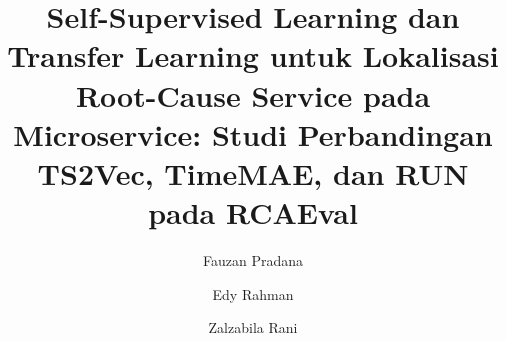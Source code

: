 \documentclass[runningheads]{llncs}
\begin{document}
\title{Self-Supervised Learning dan Transfer Learning untuk Lokalisasi Root-Cause Service pada Microservice: Studi Perbandingan TS2Vec, TimeMAE, dan RUN pada RCAEval}

\author{Fauzan Pradana \and Edy Rahman \and Zalzabila Rani}
\maketitle












\end{document}
